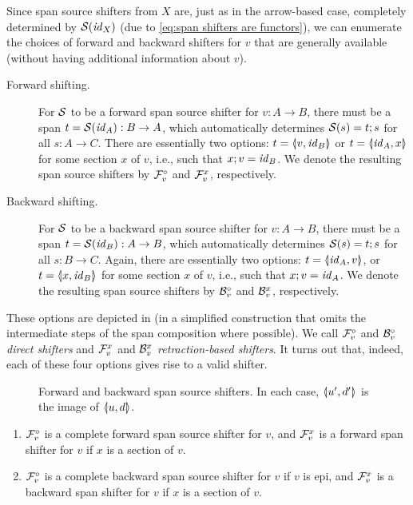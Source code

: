 Since span source shifters from $X$ are, just as in the arrow-based case, completely determined by $\cS(\id_X)$ (due to \eqref{eq:span shifters are functors}), we can enumerate the choices of forward and backward shifters for $v$ that are generally available (without having additional information about $v$).
%
\begin{description}
\item[Forward shifting.] For $\cS$ to be a forward span source shifter for $v:A\to B$, there must be a span $t=\cS(\id_A):B\to A$, which automatically determines $\cS(s)=t;s$ for all $s:A\to C$. There are essentially two options: $t=\spanof{v}{\id_B}$ or $t=\spanof{\id_A}{x}$ for some section $x$ of $v$, i.e., such that $x;v=\id_B$. We denote the resulting span source shifters by $\cF_v^\circ$ and $\cF_v^x$, respectively.

\item[Backward shifting.] For $\cS$ to be a backward span source shifter for $v:A\to B$, there must be a span $t=\cS(\id_B):A\to B$, which automatically determines $\cS(s)=t;s$ for all $s:B\to C$. Again, there are essentially two options: $t=\spanof{\id_A}{v}$, or $t=\spanof{x}{\id_B}$ for some section $x$ of $v$, i.e., such that $x;v=\id_A$. We denote the resulting span source shifters by $\cB_v^\circ$ and $\cB_v^x$, respectively.
\end{description}
%
These options are depicted in  (in a simplified construction that omits the intermediate steps of the span composition where possible). We call $\dF v$ and $\dB v$ \emph{direct shifters} and $\rF v x$ and $\rB v x$ \emph{retraction-based shifters}. It turns out that, indeed, each of these four options gives rise to a valid shifter.
%
\begin{figure}
\centering

\caption{Forward and backward span source shifters. In each case, $\spanof{u'}{d'}$ is the image of $\spanof{u}{d}$.}
\end{figure}
%
\begin{proposition}
\begin{enumerate}
\item $\cF_v^\circ$ is a complete forward span source shifter for $v$, and $\cF_v^x$ is a forward span shifter for $v$ if $x$ is a section of $v$.
\item $\cF_v^\circ$ is a complete backward span source shifter for $v$ if $v$ is epi, and $\cF_v^x$ is a backward span shifter for $v$ if $x$ is a section of $v$.
\end{enumerate}
\end{proposition}


